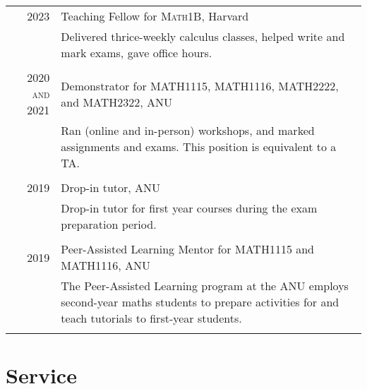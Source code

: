 \documentclass[a4paper,10pt]{article} %
\begin{document}
\begin{tabular}{r|p{12cm}}

\textsc{2023} & Teaching Fellow for \textsc{Math1B}, Harvard \emph{}\\
& \footnotesize{Delivered thrice-weekly calculus classes, helped write and mark exams, gave office hours.}\\
\multicolumn{2}{c}{} \\


\textsc{2020 and 2021} & Demonstrator for \textsc{MATH1115, MATH1116, MATH2222}, and \textsc{MATH2322}, ANU \emph{}\\
& \footnotesize{Ran (online and in-person) workshops, and marked assignments and exams. This position is equivalent to a TA.}\\
\multicolumn{2}{c}{} \\


\textsc{2019} & Drop-in tutor, ANU \emph{}\\
& \footnotesize{Drop-in tutor for first year courses during the exam preparation period.}\\
\multicolumn{2}{c}{} \\


\textsc{2019} & Peer-Assisted Learning Mentor for \textsc{MATH1115} and \textsc{MATH1116}, ANU \emph{}\\
& \footnotesize{The Peer-Assisted Learning program at the ANU employs second-year maths students to prepare activities for and teach tutorials to first-year students.}\\
\multicolumn{2}{c}{} \\

\end{tabular}

\section{Service}
\end{document}
